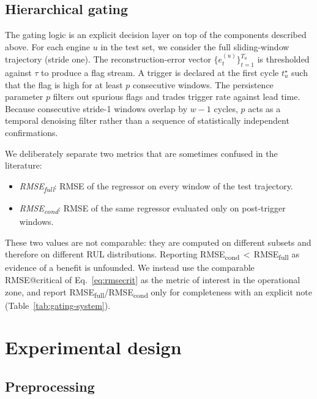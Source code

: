 \documentclass[5p,times,authoryear]{elsarticle}
\begin{document}
\subsection{Hierarchical gating}\label{sec:method-gating}

The gating logic is an explicit decision layer on top of the components described above. For each engine $u$ in the test set, we consider the full sliding-window trajectory (stride one). The reconstruction-error vector $\{e_t^{(u)}\}_{t=1}^{T_u}$ is thresholded against $\tau$ to produce a flag stream. A trigger is declared at the first cycle $t^\star_u$ such that the flag is high for at least $p$ consecutive windows. The persistence parameter $p$ filters out spurious flags and trades trigger rate against lead time. Because consecutive stride-1 windows overlap by $w-1$ cycles, $p$ acts as a temporal denoising filter rather than a sequence of statistically independent confirmations.

We deliberately separate two metrics that are sometimes confused in the literature:
\begin{itemize}
    \item \emph{RMSE\textsubscript{full}}: RMSE of the regressor on every window of the test trajectory.
    \item \emph{RMSE\textsubscript{cond}}: RMSE of the same regressor evaluated only on post-trigger windows.
\end{itemize}
These two values are not comparable: they are computed on different subsets and therefore on different RUL distributions. Reporting RMSE\textsubscript{cond}\,$<$\,RMSE\textsubscript{full} as evidence of a benefit is unfounded. We instead use the comparable RMSE@critical of Eq.~\eqref{eq:rmsecrit} as the metric of interest in the operational zone, and report RMSE\textsubscript{full}/RMSE\textsubscript{cond} only for completeness with an explicit note (Table~\ref{tab:gating-system}).

\section{Experimental design}\label{sec:exp}

\subsection{Preprocessing}\label{sec:exp-preproc}
\end{document}
